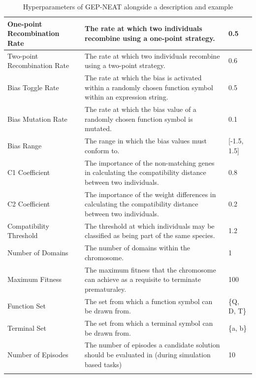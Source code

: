 \begin{xltabular}{\textwidth}{|l|X|l|}
One-point Recombination Rate        & The rate at which two individuals recombine using a one-point strategy.                                                   & 0.5                    \\ \hline
Two-point Recombination Rate        & The rate at which two individuals recombine using a two-point strategy.                                                   & 0.6                    \\ \hline
Bias Toggle Rate                    & The rate at which the bias is activated within a randomly chosen function symbol within an expression string.             & 0.5                    \\ \hline
Bias Mutation Rate                  & The rate at which the bias value of a randomly chosen function symbol is mutated.                                         & 0.1                    \\ \hline
Bias Range                          & The range in which the bias values must conform to.                                                                       & {[}-1.5, 1.5{]}        \\ \hline
C1 Coefficient                      & The importance of the non-matching genes in calculating the compatibility distance between two individuals.               & 0.8                    \\ \hline
C2 Coefficient                      & The importance of the weight differences in calculating the compatibility distance between two individuals.               & 0.2                    \\ \hline
Compatibility Threshold             & The threshold at which individuals may be classified as being part of the same species.                                   & 1.2                    \\ \hline
Number of Domains                   & The number of domains within the chromosome.                                                                              & 1                      \\ \hline
Maximum Fitness                     & The maximum fitness that the chromosome can achieve as a requisite to terminate prematuraley.                             & 100                    \\ \hline
Function Set                        & The set from which a function symbol can be drawn from.                                                                   & \{Q, D, T\}            \\ \hline
Terminal Set                        & The set from which a terminal symbol can be drawn from.                                                                   & \{a, b\}               \\ \hline
Number of Episodes                  & The number of episodes a candidate solution should be evaluated in (during simulation based tasks)                        & 10                     \\ \hline
\caption{Hyperparameters of GEP-NEAT alongside a description and example}\label{table:proto_hyper}
\end{xltabular}

